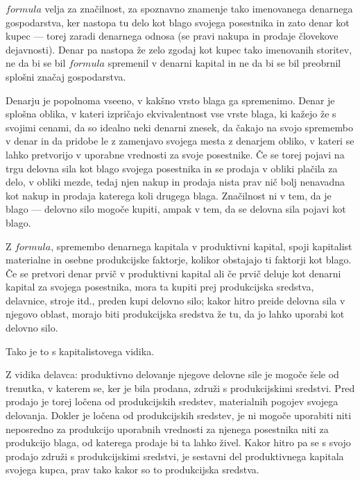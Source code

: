 \documentclass[a5paper]{scrbook}
\begin{document}
\( formula \) velja za značilnost, za spoznavno znamenje tako imenovanega denarnega gospodarstva, ker nastopa tu delo kot blago svojega posestnika in zato denar kot kupec --- torej zaradi denarnega odnosa (se pravi nakupa in prodaje človekove dejavnosti). Denar pa nastopa že zelo zgodaj kot kupec tako imenovanih storitev, ne da bi se bil \( formula \) spremenil v denarni kapital in ne da bi se bil preobrnil splošni značaj gospodarstva.

Denarju je popolnoma vseeno, v kakšno vrsto blaga ga spremenimo. Denar je splošna oblika, v kateri izpričajo ekvivalentnost vse vrste blaga, ki kažejo že s svojimi cenami, da so idealno neki denarni znesek, da čakajo na svojo spremembo v denar in da pridobe le z zamenjavo svojega mesta z denarjem obliko, v kateri se lahko pretvorijo v uporabne vrednosti za svoje posestnike. Če se torej pojavi na trgu delovna sila kot blago svojega posestnika in se prodaja v obliki plačila za delo, v obliki mezde, tedaj njen nakup in prodaja nista prav nič bolj nenavadna kot nakup in prodaja katerega koli drugega blaga. Značilnost ni v tem, da je blago --- delovno silo mogoče kupiti, ampak v tem, da se delovna sila pojavi kot blago.

Z \( formula \), spremembo denarnega kapitala v produktivni kapital, spoji kapitalist materialne in osebne produkcijske faktorje, kolikor obstajajo ti faktorji kot blago. Če se pretvori denar prvič v produktivni kapital ali če prvič deluje kot denarni kapital za svojega posestnika, mora ta kupiti prej produkcijska sredstva, delavnice, stroje itd., preden kupi delovno silo; kakor hitro preide delovna sila v njegovo oblast, morajo biti produkcijska sredstva že tu, da jo lahko uporabi kot delovno silo.

Tako je to s kapitalistovega vidika.

Z vidika delavca: produktivno delovanje njegove delovne sile je mogoče šele od trenutka, v katerem se, ker je bila prodana, združi s produkcijskimi sredstvi. Pred prodajo je torej ločena od produkcijskih sredstev, materialnih pogojev svojega delovanja. Dokler je ločena od produkcijskih sredstev, je ni mogoče uporabiti niti neposredno za produkcijo uporabnih vrednosti za njenega posestnika niti za produkcijo blaga, od katerega prodaje bi ta lahko živel. Kakor hitro pa se s svojo prodajo združi s produkcijskimi sredstvi, je sestavni del produktivnega kapitala svojega kupca, prav tako kakor so to produkcijska sredstva.
\end{document}
